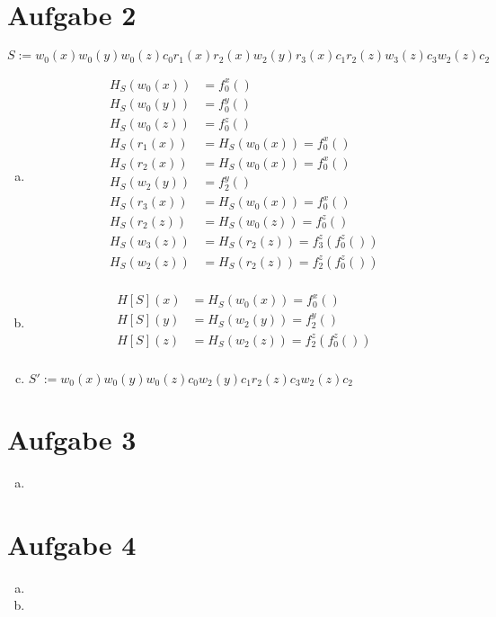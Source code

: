 \documentclass{scrartcl}
\begin{document}
\section*{Aufgabe 2}
$S := w_0(x)w_0(y)w_0(z)c_0r_1(x)r_2(x)w_2(y)r_3(x)c_1r_2(z)w_3(z)c_3w_2(z)c_2$
\begin{enumerate}[a)]
\item
\begin{align*}
H_S(w_0(x)) &= f_0^x()\\
H_S(w_0(y)) &= f_0^y()\\
H_S(w_0(z)) &= f_0^z()\\
H_S(r_1(x)) &= H_S(w_0(x)) = f_0^x()\\
H_S(r_2(x)) &= H_S(w_0(x)) = f_0^x()\\
H_S(w_2(y)) &= f_2^y()\\
H_S(r_3(x)) &= H_S(w_0(x)) = f_0^x()\\
H_S(r_2(z)) &= H_S(w_0(z)) = f_0^z()\\
H_S(w_3(z)) &= H_S(r_2(z)) = f_3^z(f_0^z())\\
H_S(w_2(z)) &= H_S(r_2(z)) = f_2^z(f_0^z())\\
\end{align*}

\item
\begin{align*}
H[S](x) &= H_S(w_0(x)) = f_0^x()\\
H[S](y) &= H_S(w_2(y)) = f_2^y()\\
H[S](z) &= H_S(w_2(z)) = f_2^z(f_0^z())\\
\end{align*}

\item 
$S' := w_0(x)w_0(y)w_0(z)c_0w_2(y)c_1r_2(z)c_3w_2(z)c_2$
\end{enumerate}

\section*{Aufgabe 3}

\begin{enumerate}[a)]
\item

\end{enumerate}

\section*{Aufgabe 4}
\begin{enumerate}[a)]
\item
\item
\end{enumerate}
\end{document}
